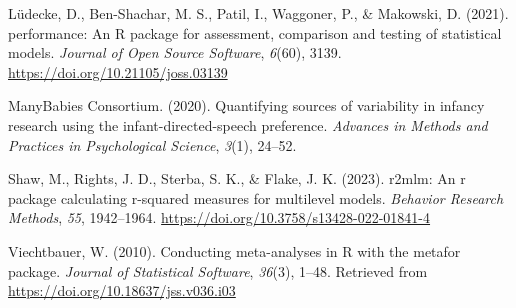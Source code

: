 \documentclass[
  english,
  man, donotrepeattitle,floatsintext]{apa6}
\newlength{\cslhangindent}
\newlength{\cslentryspacingunit} %
\newenvironment{CSLReferences}[2] %
 {%
  \setlength{\parindent}{0pt}
  \ifodd #1
  \let\oldpar\par
  \def\par{\hangindent=\cslhangindent\oldpar}
  \fi
  \setlength{\parskip}{#2\cslentryspacingunit}
 }%
 {}
\begin{document}
\hypertarget{refs}{}
\begin{CSLReferences}{1}{0}
\leavevmode{}%
Lüdecke, D., Ben-Shachar, M. S., Patil, I., Waggoner, P., \& Makowski, D. (2021). {performance}: An {R} package for assessment, comparison and testing of statistical models. \emph{Journal of Open Source Software}, \emph{6}(60), 3139. \url{https://doi.org/10.21105/joss.03139}

\leavevmode{}%
ManyBabies Consortium. (2020). Quantifying sources of variability in infancy research using the infant-directed-speech preference. \emph{Advances in Methods and Practices in Psychological Science}, \emph{3}(1), 24--52.

\leavevmode{}%
Shaw, M., Rights, J. D., Sterba, S. K., \& Flake, J. K. (2023). r2mlm: An r package calculating r-squared measures for multilevel models. \emph{Behavior Research Methods}, \emph{55}, 1942--1964. \url{https://doi.org/10.3758/s13428-022-01841-4}

\leavevmode{}%
Viechtbauer, W. (2010). Conducting meta-analyses in {R} with the {metafor} package. \emph{Journal of Statistical Software}, \emph{36}(3), 1--48. Retrieved from \url{https://doi.org/10.18637/jss.v036.i03}

\end{CSLReferences}

\endgroup
\end{document}
